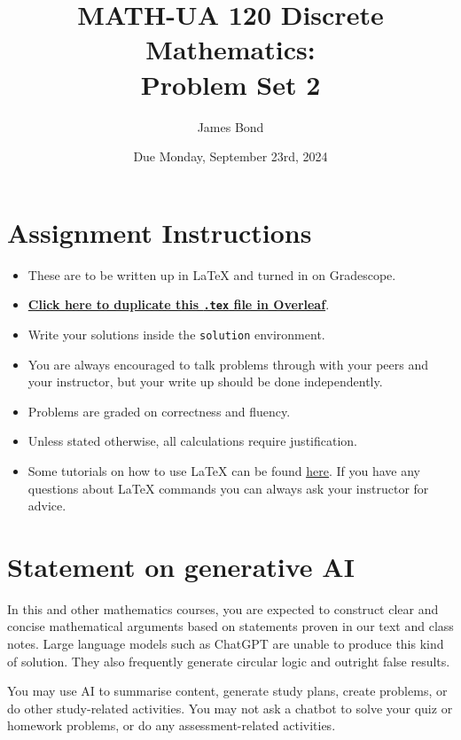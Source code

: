 \documentclass{article}
\title{\textbf{MATH-UA 120 Discrete Mathematics: \\ Problem Set 2}}
\author{%
    James Bond %
}
\date{Due Monday, September 23rd, 2024} %
\theoremstyle{definition}
\begin{document}
\maketitle %

\vfill

\section*{Assignment Instructions}

\begin{itemize}
    \item These are to be written up in \LaTeX{} and turned in on Gradescope.
    \item \href{https://bit.ly/3XfKMtA}{\textbf{Click here to duplicate this \texttt{.tex} file in Overleaf}}.
    \item Write your solutions inside the \texttt{solution} environment.
    \item You are always encouraged to talk problems through with your peers and your instructor, but your write up should be done independently.
    \item Problems are graded on correctness and fluency.
    \item Unless stated otherwise, all calculations require justification.
    \item Some tutorials on how to use \LaTeX{} can be found \href{https://www.overleaf.com/learn/latex/Tutorials}{\underline{here}}. If you have any questions about \LaTeX{} commands you can always ask your instructor for advice.
\end{itemize}

\vfill

\section*{Statement on generative AI}

In this and other mathematics courses, you are expected to construct clear and concise mathematical arguments based on statements proven in our text and class notes. Large language models such as ChatGPT are unable to produce this kind of solution. They also frequently generate circular logic and outright false results.
 
You may use AI to summarise content, generate study plans, create problems, or do other study-related activities. You may not ask a chatbot to solve your quiz or homework problems, or do any assessment-related activities.
 
\end{document}
